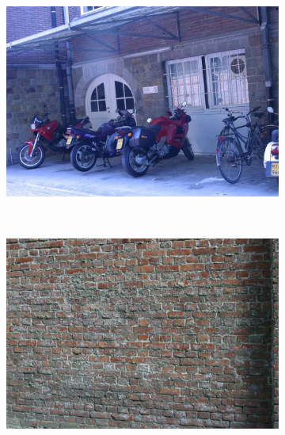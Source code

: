 \documentclass[review]{elsarticle}
\begin{document}
\begin{figure}[b]
\begin{subfigure}[t]{0.20\columnwidth}
    \end{subfigure}%
    ~ %
    \begin{subfigure}[t]{0.23\columnwidth}
        \centering
        \includegraphics[width=1\columnwidth]{images/acr/bikes1}
    \end{subfigure}%
    ~ %
    \begin{subfigure}[t]{0.23\columnwidth}
        \centering
        \includegraphics[width=1\columnwidth]{images/acr/wall1}
    \end{subfigure}%
    \vspace{1.5 mm}


\end{figure}
\end{document}
